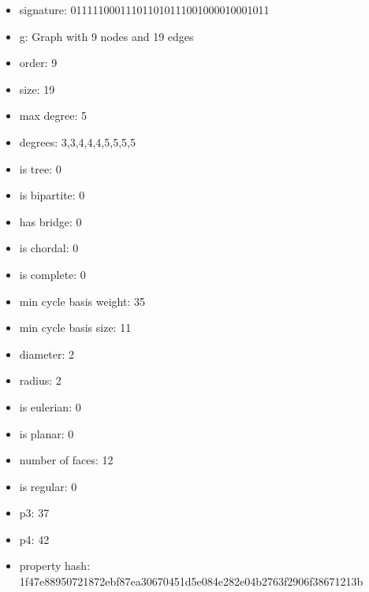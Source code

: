 \newpage
\begin{figure}
\end{figure}
\begin{itemize}
\item signature: 011111000111011010111001000010001011
\item g: Graph with 9 nodes and 19 edges
\item order: 9
\item size: 19
\item max degree: 5
\item degrees: 3,3,4,4,4,5,5,5,5
\item is tree: 0
\item is bipartite: 0
\item has bridge: 0
\item is chordal: 0
\item is complete: 0
\item min cycle basis weight: 35
\item min cycle basis size: 11
\item diameter: 2
\item radius: 2
\item is eulerian: 0
\item is planar: 0
\item number of faces: 12
\item is regular: 0
\item p3: 37
\item p4: 42
\item property hash: 1f47e88950721872ebf87ea30670451d5e084e282e04b2763f2906f38671213b
\end{itemize}
